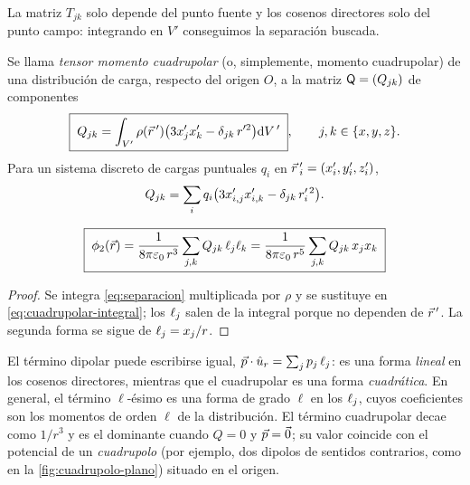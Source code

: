 La matriz $T_{jk}$ solo depende del punto fuente y los cosenos directores solo del punto campo: integrando en $V'$ conseguimos la separación buscada.

\begin{definicion}\label{def:cuadrupolo}
Se llama \emph{tensor momento cuadrupolar} (o, simplemente, momento cuadrupolar) de una distribución de carga, respecto del origen $O$, a la matriz
$\mathsf{Q}=(Q_{jk})$ de componentes
\begin{equation}\label{eq:Qjk}
  \boxed{\;Q_{jk}=\int_{V'}\rho(\vec{r}\,')\bigl(3x'_jx'_k-\delta_{jk}\,r'^{2}\bigr)\mathrm{d} V\,'\;},\qquad j,k\in\{x,y,z\}.
\end{equation}
Para un sistema discreto de cargas puntuales $q_i$ en $\vec{r}\,'_i=(x'_i,y'_i,z'_i)$,
\begin{equation}\label{eq:Qjk-discreto}
  Q_{jk}=\sum_{i}q_i\bigl(3x'_{i,j}x'_{i,k}-\delta_{jk}\,r_i'^{\,2}\bigr).
\end{equation}
\end{definicion}

\begin{proposicion}\label{prop:cuadrupolar}
\begin{equation}\label{eq:cuadrupolar}
  \boxed{\;\phi_{2}(\vec{r})=\frac{1}{8\pi\varepsilon_{0}\,r^{3}}\sum_{j,k}Q_{jk}\,\ell_{j}\ell_{k}=\frac{1}{8\pi\varepsilon_{0}\,r^{5}}\sum_{j,k}Q_{jk}\,x_jx_k\;}
\end{equation}
\end{proposicion}
\begin{proof}
Se integra \cref{eq:separacion} multiplicada por $\rho$ y se sustituye en \cref{eq:cuadrupolar-integral}; los $\ell_{j}$ salen de la integral porque no dependen de
$\vec{r}\,'$. La segunda forma se sigue de $\ell_{j}=x_j/r$.
\end{proof}

\begin{observacion}\label{obs:analogia-p-Q}
El término dipolar puede escribirse igual, $\vec{p}\cdot\hat{u}_{r}=\sum_jp_j\,\ell_{j}$: es una forma \emph{lineal} en los cosenos directores, mientras que el cuadrupolar es una
forma \emph{cuadrática}. En general, el término $\ell$-ésimo es una forma de grado $\ell$ en los $\ell_{j}$, cuyos coeficientes son los momentos de orden $\ell$ de la
distribución. El término cuadrupolar decae como $1/r^{3}$ y es el dominante cuando $Q=0$ y $\vec{p}=\vec{0}$; su valor coincide con el potencial de un
\emph{cuadrupolo} (por ejemplo, dos dipolos de sentidos contrarios, como en la \cref{fig:cuadrupolo-plano}) situado en el origen.
\end{observacion}

